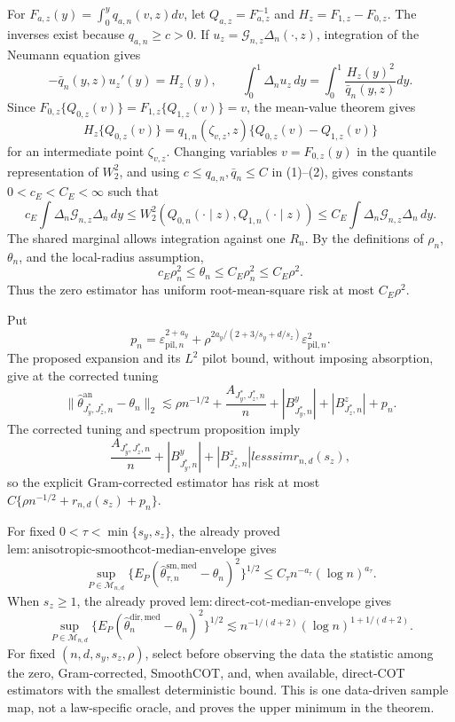 For \(F_{a,z}(y)=\int_0^yq_{a,n}(v,z)dv\), let \(Q_{a,z}=F_{a,z}^{-1}\) and \(H_z=F_{1,z}-F_{0,z}\). The inverses exist because \(q_{a,n}\ge c>0\). If \(u_z=\mathcal G_{n,z}\Delta_n(\cdot,z)\), integration of the Neumann equation gives
\[
-\bar q_n(y,z)u_z'(y)=H_z(y),
\qquad
\int_0^1\Delta_nu_z\,dy=\int_0^1\frac{H_z(y)^2}{\bar q_n(y,z)}dy. \tag{1}
\]
Since \(F_{0,z}\{Q_{0,z}(v)\}=F_{1,z}\{Q_{1,z}(v)\}=v\), the mean-value theorem gives
\[
H_z\{Q_{0,z}(v)\}
=q_{1,n}(\zeta_{v,z},z)\{Q_{0,z}(v)-Q_{1,z}(v)\}                \tag{2}
\]
for an intermediate point \(\zeta_{v,z}\). Changing variables \(v=F_{0,z}(y)\) in the quantile representation of \(W_2^2\), and using \(c\le q_{a,n},\bar q_n\le C\) in (1)--(2), gives constants \(0<c_E<C_E<\infty\) such that
\[
c_E\int\Delta_n\mathcal G_{n,z}\Delta_n\,dy
\le W_2^2(Q_{0,n}(\cdot\mid z),Q_{1,n}(\cdot\mid z))
\le C_E\int\Delta_n\mathcal G_{n,z}\Delta_n\,dy.              \tag{3}
\]
The shared marginal allows integration against one \(R_n\). By the definitions of \(\rho_n\), \(\theta_n\), and the local-radius assumption,
\[
c_E\rho_n^2\le\theta_n\le C_E\rho_n^2\le C_E\rho^2.           \tag{4}
\]
Thus the zero estimator has uniform root-mean-square risk at most \(C_E\rho^2\).

Put
\[
p_n=\varepsilon_{\mathrm{pil},n}^{2+a_y}
+\rho^{2a_y/(2+3/s_y+d/s_z)}\varepsilon_{\mathrm{pil},n}^2.
\]
The proposed expansion and its \(L^2\) pilot bound, without imposing absorption, give at the corrected tuning
\[
\|\widehat\theta^{\mathrm{an}}_{J_y^*,J_z^*,n}-\theta_n\|_2
\lesssim\rho n^{-1/2}+\frac{A_{J_y^*,J_z^*,n}}n
+|B^y_{J_y^*,n}|+|B^z_{J_z^*,n}|+p_n.                           \tag{5}
\]
The corrected tuning and spectrum proposition imply
\[
\frac{A_{J_y^*,J_z^*,n}}n
+|B^y_{J_y^*,n}|+|B^z_{J_z^*,n}|lesssim r_{n,d}(s_z),            \tag{6}
\]
so the explicit Gram-corrected estimator has risk at most \(C\{\rho n^{-1/2}+r_{n,d}(s_z)+p_n\}\).

For fixed \(0<\tau<\min\{s_y,s_z\}\), the already proved \(\mathrm{lem{:}anisotropic\text{-}smoothcot\text{-}median\text{-}envelope}\) gives
\[
\sup_{P\in\mathcal M_{n,d}}
\{E_P(\widehat\theta^{\mathrm{sm,med}}_{\tau,n}-\theta_n)^2\}^{1/2}
\le C_\tau n^{-a_\tau}(\log n)^{a_\tau}.                       \tag{7}
\]
When \(s_z\ge1\), the already proved \(\mathrm{lem{:}direct\text{-}cot\text{-}median\text{-}envelope}\) gives
\[
\sup_{P\in\mathcal M_{n,d}}
\{E_P(\widehat\theta_n^{\mathrm{dir,med}}-\theta_n)^2\}^{1/2}
\lesssim n^{-1/(d+2)}(\log n)^{1+1/(d+2)}.                      \tag{8}
\]
For fixed \((n,d,s_y,s_z,\rho)\), select before observing the data the statistic among the zero, Gram-corrected, SmoothCOT, and, when available, direct-COT estimators with the smallest deterministic bound. This is one data-driven sample map, not a law-specific oracle, and proves the upper minimum in the theorem.


